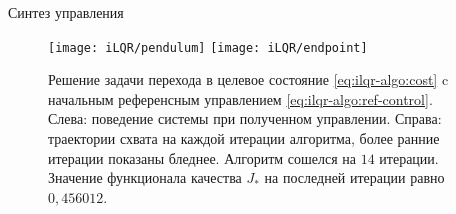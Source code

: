 \documentclass[../../doc.tex]{subfiles}
\begin{document}
    \begin{rusalgorithm}\caption{Синтез управления}\label{alg:Sinthesis}
        \DontPrintSemicolon
    \end{rusalgorithm}

    \begin{figure}[h]
        \begin{center}
            \texttt{[image: iLQR/pendulum]}
            \texttt{[image: iLQR/endpoint]}
        \end{center}
        \caption{
            Решение задачи перехода в целевое состояние \eqref{eq:ilqr-algo:cost} c начальным референсным управлением \eqref{eq:ilqr-algo:ref-control}.
            Слева: поведение системы при полученном управлении. Справа: траектории схвата на каждой итерации алгоритма, более ранние итерации показаны бледнее.
            Алгоритм сошелся на $14$ итерации.
            Значение функционала качества $J_*$ на последней итерации равно $0,\!456012$.
        }
    \end{figure}

    \ifSubfilesClassLoaded{
        \nocite{*}
        \clearpage
        
        
    }{}
\end{document}
